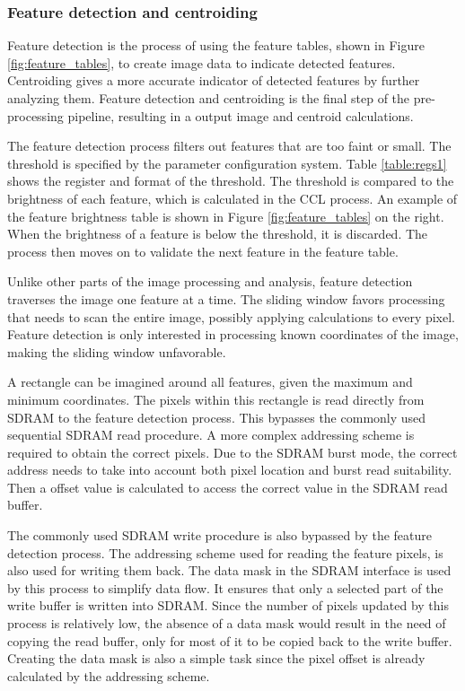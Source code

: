 \documentclass[12pt]{report}
\begin{document}
\subsubsection{Feature detection and centroiding}
Feature detection is the process of using the feature tables, shown in Figure \ref*{fig:feature_tables}, to create image data to indicate detected features. Centroiding gives a more accurate indicator of detected features by further analyzing them. Feature detection and centroiding is the final step of the pre-processing pipeline, resulting in a output image and centroid calculations.
\par
The feature detection process filters out features that are too faint or small. The threshold is specified by the parameter configuration system. Table \ref*{table:regs1} shows the register and format of the threshold. The threshold is compared to the brightness of each feature, which is calculated in the CCL process. An example of the feature brightness table is shown in Figure \ref*{fig:feature_tables} on the right. When the brightness of a feature is below the threshold, it is discarded. The process then moves on to validate the next feature in the feature table.
\par
Unlike other parts of the image processing and analysis, feature detection traverses the image one feature at a time. The sliding window favors processing that needs to scan the entire image, possibly applying calculations to every pixel. Feature detection is only interested in processing known coordinates of the image, making the sliding window unfavorable.
\par
A rectangle can be imagined around all features, given the maximum and minimum coordinates. The pixels within this rectangle is read directly from SDRAM to the feature detection process. This bypasses the commonly used sequential SDRAM read procedure. A more complex addressing scheme is required to obtain the correct pixels. Due to the SDRAM burst mode, the correct address needs to take into account both pixel location and burst read suitability. Then a offset value is calculated to access the correct value in the SDRAM read buffer.
\par
The commonly used SDRAM write procedure is also bypassed by the feature detection process. The addressing scheme used for reading the feature pixels, is also used for writing them back. The data mask in the SDRAM interface is used by this process to simplify data flow. It ensures that only a selected part of the write buffer is written into SDRAM. Since the number of pixels updated by this process is relatively low, the absence of a data mask would result in the need of copying the read buffer, only for most of it to be copied back to the write buffer. Creating the data mask is also a simple task since the pixel offset is already calculated by the addressing scheme.
\end{document}

